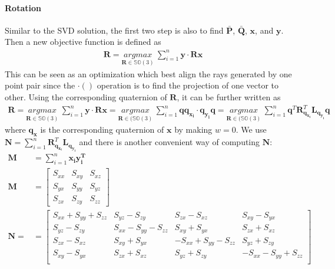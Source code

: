 \documentclass[a4paper]{report}
\begin{document}
\paragraph{Rotation}
Similar to the SVD solution, the first two step is also to find $\bar{\mathbf{P}}$, $\bar{\mathbf{Q}}$, $\mathbf{x}$, and $\mathbf{y}$. Then a new objective function is defined as
\begin{align*}
\mathbf{R}=\underset{\mathbf{R}\in \mathbb{SO}(3)}{argmax}\ \sum_{i=1}^{n} \mathbf{y} \cdot \mathbf{Rx}
\end{align*}
This can be seen as an optimization which best align the rays generated by one point pair since the $\cdot()$ operation is to find the projection of one vector to other. Using the corresponding quaternion of $\mathbf{R}$, it can be further written as
\begin{align*}
\mathbf{R}=\underset{\mathbf{R}\in \mathbb{SO}(3)}{argmax}\ \sum_{i=1}^{n} \mathbf{y} \cdot \mathbf{Rx}=\underset{\mathbf{R}\in (\mathbb{SO}(3)}{argmax}\ \sum_{i=1}^{n} \mathbf{qq_{x_i}} \cdot \mathbf{q_{y_i}q} = \underset{\mathbf{R}\in (\mathbb{SO}(3)}{argmax}\  \sum_{i=1}^{n} \mathbf{q}^T\mathbf{R}_{\mathbf{q_{x_i}}}^T\mathbf{L}_{\mathbf{q_{y_i}}}\mathbf{q}
\end{align*}
where $\mathbf{q_x}$ is the corresponding quaternion of $\mathbf{x}$ by making $w=0$. 
We use $\mathbf{N}=\sum_{i=1}^{n}\mathbf{R}_{\mathbf{q_{x_i}}}^T\mathbf{L}_{\mathbf{q_{y_i}}}$ and there is another convenient way of computing $\mathbf{N}$:
\begin{align*}
	\mathbf{M}&=\sum_{i=1}^{n} \mathbf{x_iy_i^T} \\
	\mathbf{M}&=\left[
	\begin{matrix}
	S_{xx} & S_{xy} & S_{xz} \\
	S_{yx} & S_{yy} & S_{yz} \\
	S_{zx} & S_{zy} & S_{zz} 
	\end{matrix}
	\right] \\
	\mathbf{N}=&=\left[
	\begin{matrix}
	S_{xx}+S_{yy}+S_{zz} & S_{yz}-S_{zy} & S_{zx}-S_{xz} & S_{xy}-S_{yx} \\
	S_{yz}-S_{zy} & S_{xx}-S_{yy}-S_{zz} & S_{xy}+S_{yx} & S_{zx}+S_{xz} \\
	S_{zx}-S_{xz} &  S_{xy}+S_{yx} & -S_{xx}+S_{yy}-S_{zz}& S_{yz}+S_{zy} \\
	S_{xy}-S_{yx} & S_{zx}+S_{xz} & S_{yz}+S_{zy} & -S_{xx}-S_{yy}+S_{zz} \\
	\end{matrix}
	\right] 
\end{align*}
\end{document}
